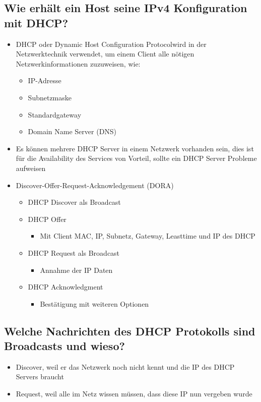 \subsection*{Wie erhält ein Host seine IPv4 Konfiguration mit DHCP?}
\begin{itemize}
    \item DHCP oder \flqq{}Dynamic Host Configuration Protocol\frqq wird in der Netzwerktechnik verwendet, um einem Client alle nötigen Netzwerkinformationen zuzuweisen, wie:
    \begin{itemize}
        \item IP-Adresse
        \item Subnetzmaske
        \item Standardgateway
        \item Domain Name Server (DNS)
    \end{itemize}
    \item Es können mehrere DHCP Server in einem Netzwerk vorhanden sein, dies ist für die Availability des Services von Vorteil, sollte ein DHCP Server Probleme aufweisen
    \item Discover-Offer-Request-Acknowledgement (DORA)
    \begin{itemize}
        \item DHCP Discover als Broadcast
        \item DHCP Offer
        \begin{itemize}
            \item Mit Client MAC, IP, Subnetz, Gateway, Leasttime und IP des DHCP
        \end{itemize}
        \item DHCP Request als Broadcast
        \begin{itemize}
            \item Annahme der IP Daten
        \end{itemize}
        \item DHCP Acknowledgment
        \begin{itemize}
            \item Bestätigung mit weiteren Optionen
        \end{itemize}
    \end{itemize}
\end{itemize}

\subsection*{Welche Nachrichten des DHCP Protokolls sind Broadcasts und wieso?}
\begin{itemize}
    \item Discover, weil er das Netzwerk noch nicht kennt und die IP des DHCP Servers braucht
    \item Request, weil alle im Netz wissen müssen, dass diese IP nun vergeben wurde
\end{itemize}

